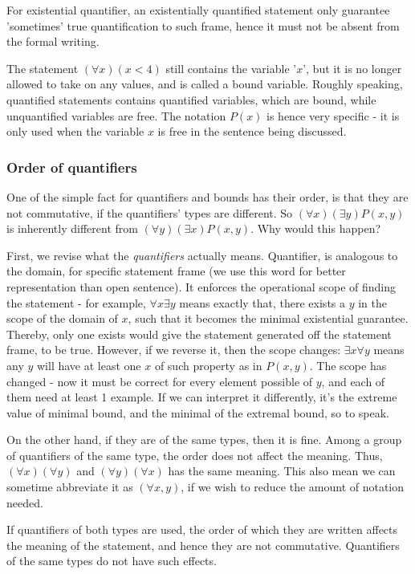 For existential quantifier, an existentially quantified statement only guarantee 'sometimes' true quantification to such frame, hence it must not be absent from the formal writing. 

The statement $(\forall x) (x< 4)$ still contains the variable '$x$', but it is no longer allowed to take on any values, and is called a bound variable. Roughly speaking, quantified statements contains quantified variables, which are bound, while unquantified variables are free. The notation $P(x)$ is hence very specific - it is only used when the variable $x$ is free in the sentence being discussed. 

\subsubsection{Order of quantifiers}
One of the simple fact for quantifiers and bounds has their order, is that they are not commutative, if the quantifiers' types are different. So $(\forall x)(\exists y)P(x,y)$ is inherently different from $(\forall y)(\exists x)P(x,y)$. Why would this happen? 

First, we revise what the \textit{quantifiers} actually means. Quantifier, is analogous to the domain, for specific statement frame (we use this word for better representation than open sentence). It enforces the operational scope of finding the statement - for example, $\forall x \exists y$ means exactly that, there exists a $y$ in the scope of the domain of $x$, such that it becomes the minimal existential guarantee. Thereby, only one exists would give the statement generated off the statement frame, to be true. However, if we reverse it, then the scope changes: $\exists x \forall y$ means any $y$ will have at least one $x$ of such property as in $P(x,y)$. The scope has changed - now it must be correct for every element possible of $y$, and each of them need at least 1 example. If we can interpret it differently, it's the extreme value of minimal bound, and the minimal of the extremal bound, so to speak. 

On the other hand, if they are of the same types, then it is fine. Among a group of quantifiers of the same type, the order does not affect the meaning. Thus, $(\forall x)(\forall y)$ and $(\forall y)(\forall x)$ has the same meaning. This also mean we can sometime abbreviate it as $(\forall x, y)$, if we wish to reduce the amount of notation needed. 

\begin{lemma}
    If quantifiers of both types are used, the order of which they are written affects the meaning of the statement, and hence they are not commutative. Quantifiers of the same types do not have such effects. 
\end{lemma}

